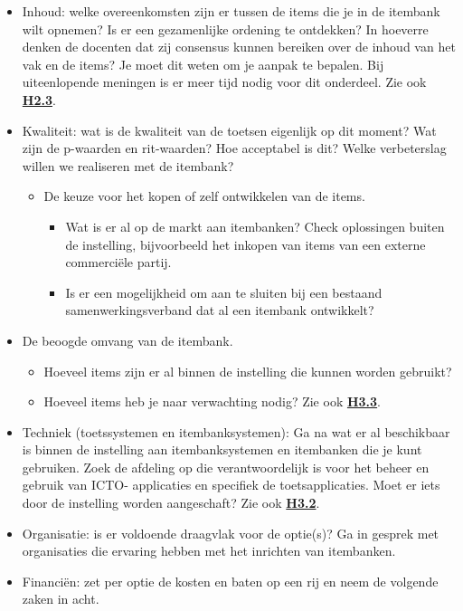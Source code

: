 \documentclass[
]{book}
\providecommand{\tightlist}{%
  \setlength{\itemsep}{0pt}\setlength{\parskip}{0pt}}
\begin{document}
\begin{itemize}
\tightlist
\item
  Inhoud: welke overeenkomsten zijn er tussen de items die je in de itembank wilt opnemen? Is er een gezamenlijke ordening te ontdekken? In hoeverre denken de docenten dat zij consensus kunnen bereiken over de inhoud van het vak en de items? Je moet dit weten om je aanpak te bepalen. Bij uiteenlopende meningen is er meer tijd nodig voor dit onderdeel. Zie ook \textbf{\protect\hyperlink{stap-3-ontwerp}{H2.3}}.
\item
  Kwaliteit: wat is de kwaliteit van de toetsen eigenlijk op dit moment? Wat zijn de p-waarden en rit-waarden? Hoe acceptabel is dit? Welke verbeterslag willen we realiseren met de itembank?

  \begin{itemize}
  \tightlist
  \item
    De keuze voor het kopen of zelf ontwikkelen van de items.

    \begin{itemize}
    \tightlist
    \item
      Wat is er al op de markt aan itembanken? Check oplossingen buiten de instelling, bijvoorbeeld het inkopen van items van een externe commerciële partij.
    \item
      Is er een mogelijkheid om aan te sluiten bij een bestaand samenwerkingsverband dat al een itembank ontwikkelt?
    \end{itemize}
  \end{itemize}
\item
  De beoogde omvang van de itembank.

  \begin{itemize}
  \tightlist
  \item
    Hoeveel items zijn er al binnen de instelling die kunnen worden gebruikt?
  \item
    Hoeveel items heb je naar verwachting nodig? Zie ook \textbf{\protect\hyperlink{omvang-van-de-itembank}{H3.3}}.
  \end{itemize}
\item
  Techniek (toetssystemen en itembanksystemen): Ga na wat er al beschikbaar is binnen de instelling aan itembanksystemen en itembanken die je kunt gebruiken. Zoek de afdeling op die verantwoordelijk is voor het beheer en gebruik van ICTO- applicaties en specifiek de toetsapplicaties. Moet er iets door de instelling worden aangeschaft? Zie ook \textbf{\protect\hyperlink{technologie-systemen}{H3.2}}.
\item
  Organisatie: is er voldoende draagvlak voor de optie(s)? Ga in gesprek met organisaties die ervaring hebben met het inrichten van itembanken.
\item
  Financiën: zet per optie de kosten en baten op een rij en neem de volgende zaken in acht.


\end{itemize}
\end{document}
